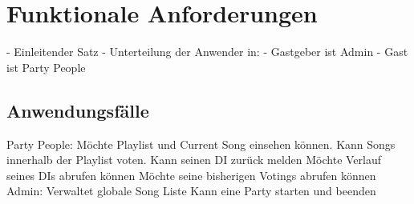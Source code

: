 \section{Funktionale Anforderungen}

- Einleitender Satz
- Unterteilung der Anwender in:
	- Gastgeber ist Admin
	- Gast ist Party People

\subsection{Anwendungsfälle}

Party People:
Möchte Playlist und Current Song einsehen können.
Kann Songs innerhalb der Playlist voten.
Kann seinen DI zurück melden
Möchte Verlauf seines DIs abrufen können
Möchte seine bisherigen Votings abrufen können
Admin:
Verwaltet globale Song Liste
Kann eine Party starten und beenden

